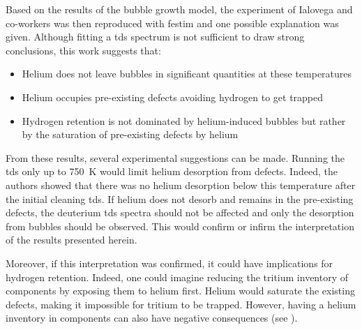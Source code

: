 Based on the results of the bubble growth model, the experiment of Ialovega and co-workers  was then reproduced with \gls{festim} and one possible explanation was given.
Although fitting a \gls{tds} spectrum is not sufficient to draw strong conclusions, this work suggests that:
\begin{itemize}
    \item Helium does not leave bubbles in significant quantities at these temperatures
    \item Helium occupies pre-existing defects avoiding hydrogen to get trapped
    \item Hydrogen retention is not dominated by helium-induced bubbles but rather by the saturation of pre-existing defects by helium
\end{itemize}

From these results, several experimental suggestions can be made.
Running the \gls{tds} only up to \SI{750}{K} would limit helium desorption from defects.
Indeed, the authors \cite{ialovega_hydrogen_2020} showed that there was no helium desorption below this temperature after the initial cleaning \gls{tds}.
If helium does not desorb and remains in the pre-existing defects, the deuterium \gls{tds} spectra should not be affected and only the desorption from bubbles should be observed.
This would confirm or infirm the interpretation of the results presented herein.

Moreover, if this interpretation was confirmed, it could have implications for hydrogen retention.
Indeed, one could imagine reducing the tritium inventory of components by exposing them to helium first.
Helium would saturate the existing defects, making it impossible for tritium to be trapped.
However, having a helium inventory in components can also have negative consequences (see ).

